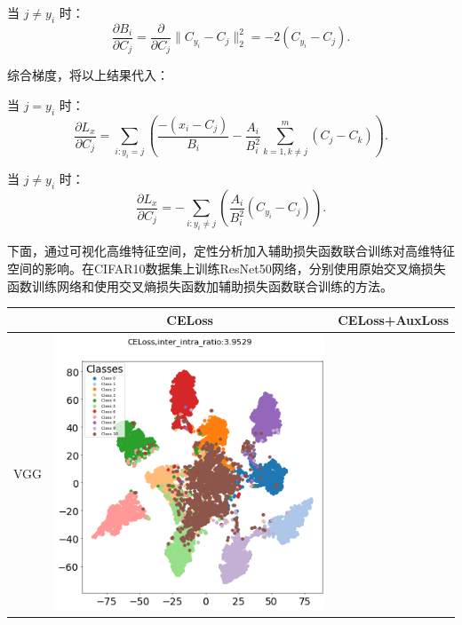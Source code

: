 当 \( j \neq y_i \) 时：
\[
\frac{\partial B_i}{\partial C_j} = \frac{\partial}{\partial C_j} \|C_{y_i} - C_j\|_2^2 = -2 (C_{y_i} - C_j).
\]


综合梯度，将以上结果代入：

当 \( j = y_i \) 时：
\[
\frac{\partial L_x}{\partial C_j} =  \sum_{i: y_i = j} \left( \frac{- (x_i - C_j)}{B_i} - \frac{A_i}{B_i^2} \sum_{k=1, k \neq j}^m  (C_j - C_k) \right).
\]

当 \( j \neq y_i \) 时：
\[
\frac{\partial L_x}{\partial C_j} = -\sum_{i: y_i \neq j} \left( \frac{A_i}{B_i^2} (C_{y_i} - C_j) \right).
\]


下面，通过可视化高维特征空间，定性分析加入辅助损失函数联合训练对高维特征空间的影响。在CIFAR10数据集上训练ResNet50网络，分别使用原始交叉熵损失函数训练网络和使用交叉熵损失函数加辅助损失函数联合训练的方法。
\begin{table}[H]
\captionsetup{font=small, justification=centering} %
\centering
\begin{tabular}{|c|c|c|}
\hline
\textbf{} & \textbf{CELoss} & \textbf{CELoss+AuxLoss} \\ \hline %
\begin{minipage}{0.1\textwidth} \centering VGG \end{minipage} & 
\begin{minipage}{0.45\textwidth} \centering \includegraphics[width=\textwidth]{assets/vgg16_tsne_feature.png} \end{minipage} & 

\end{tabular}
\end{table}

